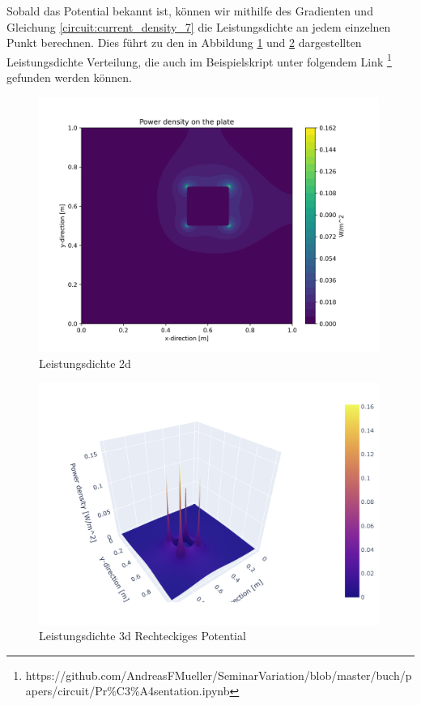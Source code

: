 Sobald das Potential bekannt ist, können wir mithilfe des Gradienten und Gleichung \ref{circuit:current_density_7} die Leistungsdichte an jedem einzelnen Punkt berechnen. Dies führt zu den in Abbildung \ref{fig:power_2d} und \ref{fig:power_3d_rectangle} dargestellten Leistungsdichte Verteilung, die auch im Beispielskript unter folgendem Link \footnote{https://github.com/AndreasFMueller/SeminarVariation/blob/master/buch/papers/circuit/Pr\%C3\%A4sentation.ipynb} gefunden werden können.
\begin{figure}[h]
	\centering
	\includegraphics[width=0.99\textwidth]{papers/circuit/power_distribution.png}
	\caption{Leistungsdichte 2d}
	\label{fig:power_2d}
\end{figure}
\begin{figure}[h]
	\centering
	\includegraphics[width=0.99\textwidth]{papers/circuit/3d.png}
	\caption{Leistungsdichte 3d Rechteckiges Potential}
	\label{fig:power_3d_rectangle}
\end{figure}
